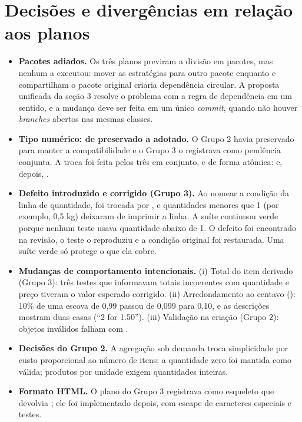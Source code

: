 \section{Decisões e divergências em relação aos planos}

\begin{itemize}
\item \textbf{Pacotes adiados.} Os três planos previram a divisão em pacotes, mas nenhum a executou: mover as estratégias para outro pacote enquanto  e  compartilham o pacote original criaria dependência circular. A proposta unificada da seção 3 resolve o problema com a regra de dependência em um sentido, e a mudança deve ser feita em um único \textit{commit}, quando não houver \textit{branches} abertos nas mesmas classes.
\item \textbf{Tipo numérico: de preservado a adotado.} O Grupo 2 havia preservado  para manter a compatibilidade e o Grupo 3 o registrava como pendência conjunta. A troca foi feita pelos três em conjunto, e de forma atômica:  e, depois, .
\item \textbf{Defeito introduzido e corrigido (Grupo 3).} Ao nomear a condição da linha de quantidade,  foi trocada por , e quantidades menores que 1 (por exemplo, 0,5 kg) deixaram de imprimir a linha. A suíte continuou verde porque nenhum teste usava quantidade abaixo de 1. O defeito foi encontrado na revisão, o teste  o reproduziu e a condição original foi restaurada. Uma suíte verde só protege o que ela cobre.
\item \textbf{Mudanças de comportamento intencionais.} (i) Total do item derivado (Grupo 3): três testes que informavam totais incoerentes com quantidade e preço tiveram o valor esperado corrigido. (ii) Arredondamento ao centavo (): 10\% de uma escova de 0,99 passou de 0,099 para 0,10, e as descrições mostram duas casas (``2 for 1.50''). (iii) Validação na criação (Grupo 2): objetos inválidos falham com .
\item \textbf{Decisões do Grupo 2.} A agregação sob demanda troca simplicidade por custo proporcional ao número de itens; a quantidade zero foi mantida como válida; produtos por unidade exigem quantidades inteiras.
\item \textbf{Formato HTML.} O plano do Grupo 3 registrava  como esqueleto que devolvia ; ele foi implementado depois, com escape de caracteres especiais e testes.
\end{itemize}

